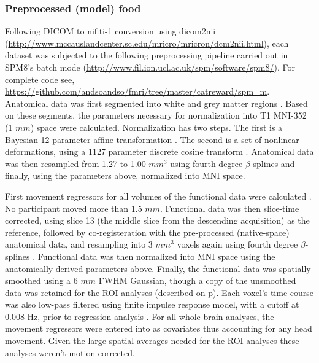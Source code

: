 \documentclass[doc,12pt]{apa}        %
\begin{document}
\subsubsection{Preprocessed (model) food}
\label{subsub:preprocessed}
Following DICOM to nifiti-1 conversion using dicom2nii (\url{http://www.mccauslandcenter.sc.edu/mricro/mricron/dcm2nii.html}), each dataset was subjected to the following preprocessing pipeline carried out in SPM8's batch mode (\url{http://www.fil.ion.ucl.ac.uk/spm/software/spm8/}).  For complete code see, \url{https://github.com/andsoandso/fmri/tree/master/catreward/spm\_m}.  Anatomical data was first segmented into white and grey matter regions \cite{Collignon:1995p9347}.  Based on these segments, the parameters necessary for normalization into T1 MNI-352 (1 $mm$) space were calculated. Normalization has two steps.  The first is a Bayesian 12-parameter affine transformation \cite{Ashburner:1997p9348}.  The second is a set of nonlinear deformations, using a 1127 parameter discrete cosine transform \cite{Ashburner:1999p9350}.  Anatomical data was then resampled from 1.27 to 1.00 $mm^3$ using fourth degree $\beta$-splines and finally, using the parameters above, normalized into MNI space.

First movement regressors for all volumes of the functional data were calculated \cite{Ashburner:1999p9350}.  No participant moved more than 1.5 $mm$.  Functional data was then slice-time corrected, using slice 13 (the middle slice from the descending acquisition) as the reference, followed by co-registeration with the pre-processed (native-space) anatomical data, and resampling into 3 $mm^3$ voxels again using fourth degree $\beta$-splines \cite{Collignon:1995p9347}.  Functional data was then normalized into MNI space using the anatomically-derived parameters above.  Finally, the functional data was spatially smoothed using a 6 $mm$ FWHM Gaussian, though a copy of the unsmoothed data was retained for the ROI analyses (described on p\pageref{sub:regoins}).  Each voxel's time course was also low-pass filtered using finite impulse response model, with a cutoff at 0.008 Hz, prior to regression analysis \cite{Kruggel:1999p9351}.  For all whole-brain analyses, the movement regressors were entered into as covariates thus accounting for any head movement.  Given the large spatial averages needed for the ROI analyses these analyses weren't motion corrected.
\end{document}
